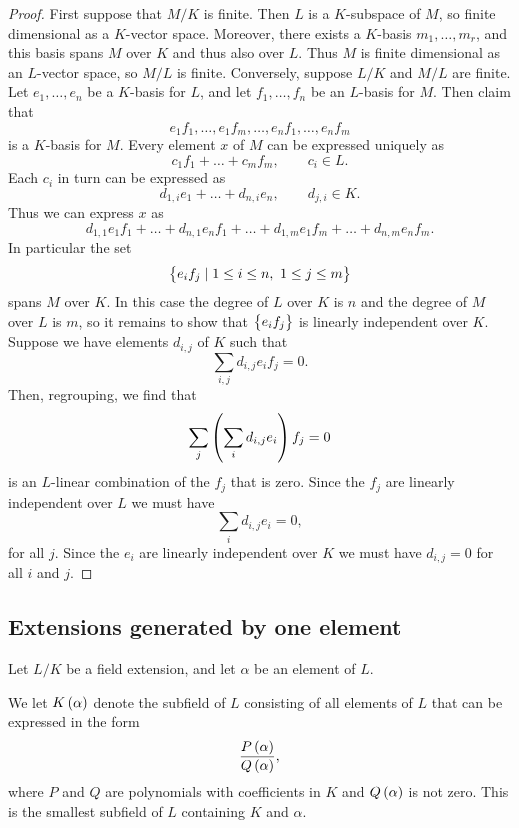 \begin{proof}
First suppose that $ M / K $ is finite. Then $ L $ is a $ K $-subspace of $ M $, so finite dimensional as a $ K $-vector space. Moreover, there exists a $ K $-basis $ m_1, \dots, m_r $, and this basis spans $ M $ over $ K $ and thus also over $ L $. Thus $ M $ is finite dimensional as an $ L $-vector space, so $ M / L $ is finite. Conversely, suppose $ L / K $ and $ M / L $ are finite. Let $ e_1, \dots, e_n $ be a $ K $-basis for $ L $, and let $ f_1, \dots, f_n $ be an $ L $-basis for $ M $. Then claim that
$$ e_1f_1, \dots, e_1f_m, \dots, e_nf_1, \dots, e_nf_m $$
is a $ K $-basis for $ M $. Every element $ x $ of $ M $ can be expressed uniquely as
$$ c_1f_1 + \dots + c_mf_m, \qquad c_i \in L. $$
Each $ c_i $ in turn can be expressed as
$$ d_{1, i}e_1 + \dots + d_{n, i}e_n, \qquad d_{j, i} \in K. $$
Thus we can express $ x $ as
$$ d_{1, 1}e_1f_1 + \dots + d_{n, 1}e_nf_1 + \dots + d_{1, m}e_1f_m + \dots + d_{n, m}e_nf_m. $$
In particular the set
$$ \cbr{e_if_j \mid 1 \le i \le n, \ 1 \le j \le m} $$
spans $ M $ over $ K $. In this case the degree of $ L $ over $ K $ is $ n $ and the degree of $ M $ over $ L $ is $ m $, so it remains to show that $ \cbr{e_if_j} $ is linearly independent over $ K $. Suppose we have elements $ d_{i, j} $ of $ K $ such that
$$ \sum_{i, j} d_{i, j}e_if_j = 0. $$
Then, regrouping, we find that
$$ \sum_j \br{\sum_i d_{i, j}e_i}f_j = 0 $$
is an $ L $-linear combination of the $ f_j $ that is zero. Since the $ f_j $ are linearly independent over $ L $ we must have
$$ \sum_i d_{i, j}e_i = 0, $$
for all $ j $. Since the $ e_i $ are linearly independent over $ K $ we must have $ d_{i, j} = 0 $ for all $ i $ and $ j $.
\end{proof}


\subsection{Extensions generated by one element}

Let $ L / K $ be a field extension, and let $ \alpha $ be an element of $ L $.

\begin{definition}
We let $ K\br{\alpha} $ denote the subfield of $ L $ consisting of all elements of $ L $ that can be expressed in the form
$$ \dfrac{P\br{\alpha}}{Q\br{\alpha}}, $$
where $ P $ and $ Q $ are polynomials with coefficients in $ K $ and $ Q\br{\alpha} $ is not zero. This is the smallest subfield of $ L $ containing $ K $ and $ \alpha $.
\end{definition}

